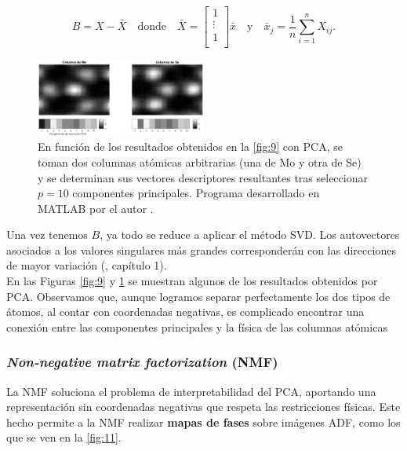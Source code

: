 \begin{equation}
    B = X - \bar X \quad \text{donde} \quad
    \bar X = 
    \begin{bmatrix}
    1        \\
    \vdots   \\
    1        \\
    \end{bmatrix} \bar x \quad \text{y} \quad
    \bar x_j = \frac{1}{n} \sum^n_{i=1} X_{ij}.
\end{equation}

\begin{figure}
    \centering
    \includegraphics[width=0.5\textwidth]{fig/Fig10.png}
    \caption{En función de los resultados obtenidos en la \autoref{fig:9} con PCA, se toman dos columnas atómicas arbitrarias (una de Mo y otra de Se) y se determinan sus vectores descriptores resultantes tras seleccionar $p = 10$ componentes principales. Programa desarrollado en MATLAB por el autor \cite{repo}.}
    \label{fig:10}
\end{figure} 

Una vez tenemos $B$, ya todo se reduce a aplicar el método SVD. Los autovectores asociados a los valores singulares más grandes corresponderán con las direcciones de mayor variación (\cite{databook}, capítulo 1).\\



En las Figuras \ref{fig:9} y \ref{fig:10} se muestran algunos de los resultados obtenidos por PCA. Observamos que, aunque logramos separar perfectamente los dos tipos de átomos, al contar con coordenadas negativas, es complicado encontrar una conexión entre las componentes principales y la física de las columnas atómicas


\subsubsection{\textit{Non-negative matrix factorization} (NMF)}

La NMF soluciona el problema de interpretabilidad del PCA, aportando una representación sin coordenadas negativas que respeta las restricciones físicas. Este hecho permite a la NMF realizar \textbf{mapas de fases} sobre imágenes ADF, como los que se ven en la \autoref{fig:11}.\\

